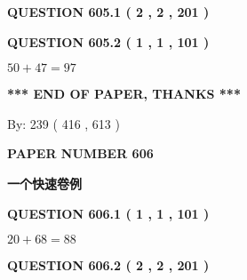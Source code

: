 \documentclass{ctexart}
\begin{document}
   
  
\vspace{0.2in}
  
{\textbf{\Large{QUESTION
605.1 
 ( 2 , 2 , 201 )
}}}
  
  
  
\vspace{0.2in}
  
{\textbf{\Large{QUESTION
605.2 
 ( 1 , 1 , 101 )
}}}
  
  
 
 

$ %
50 +  %
47=   %
97$
 
 
   
   
 \vspace{0.2in}
 
   
   
   
   
\vspace{1.0in} 
{\textbf{\large{ *** END OF PAPER, THANKS *** }}} 
   
   
\hspace{1.0in} By: 
 239 ( 416 ,  613 )
   
   
   
   
\newpage 
\setcounter{page}{ 
   606001 } 
   
   
   
   
 {\textbf{ \Large{ PAPER NUMBER  606  }}}
   
   
\vspace{0.2in}
   
   
   
   
   
   
 \vspace{0.2in}
{\LARGE {\textbf{ 一个快速卷例}}}
   
   
  
\vspace{0.2in}
  
{\textbf{\Large{QUESTION
606.1 
 ( 1 , 1 , 101 )
}}}
  
  
 
 

$ %
20 +  %
68=   %
88$
 
 
  
\vspace{0.2in}
  
{\textbf{\Large{QUESTION
606.2 
 ( 2 , 2 , 201 )
}}}
  
  
   
\end{document}
